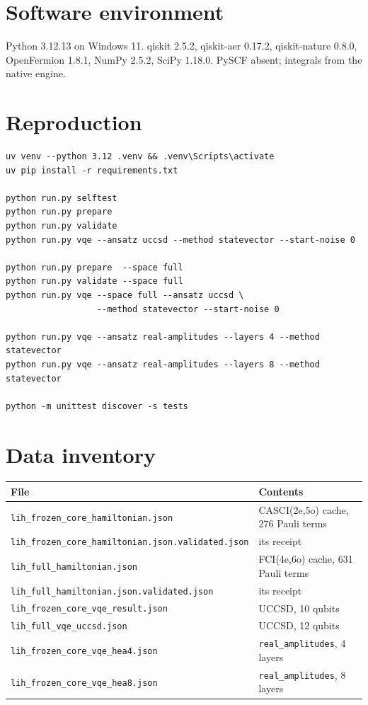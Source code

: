 \documentclass[11pt,a4paper]{article}
\newcommand{\code}[1]{\texttt{\small #1}}
\begin{document}
\section{Software environment}

Python 3.12.13 on Windows 11. qiskit 2.5.2, qiskit-aer 0.17.2, qiskit-nature
0.8.0, OpenFermion 1.8.1, NumPy 2.5.2, SciPy 1.18.0. PySCF absent; integrals
from the native engine.

\section{Reproduction}

\begin{verbatim}
uv venv --python 3.12 .venv && .venv\Scripts\activate
uv pip install -r requirements.txt

python run.py selftest
python run.py prepare
python run.py validate
python run.py vqe --ansatz uccsd --method statevector --start-noise 0

python run.py prepare  --space full
python run.py validate --space full
python run.py vqe --space full --ansatz uccsd \
                  --method statevector --start-noise 0

python run.py vqe --ansatz real-amplitudes --layers 4 --method statevector
python run.py vqe --ansatz real-amplitudes --layers 8 --method statevector

python -m unittest discover -s tests
\end{verbatim}

\section{Data inventory}

\begin{center}
\small
\begin{tabular}{ll}
\toprule
File & Contents \\
\midrule
\code{lih\_frozen\_core\_hamiltonian.json}       & CASCI(2e,5o) cache, 276 Pauli terms \\
\code{lih\_frozen\_core\_hamiltonian.json.validated.json} & its receipt \\
\code{lih\_full\_hamiltonian.json}               & FCI(4e,6o) cache, 631 Pauli terms \\
\code{lih\_full\_hamiltonian.json.validated.json} & its receipt \\
\code{lih\_frozen\_core\_vqe\_result.json}       & UCCSD, 10 qubits \\
\code{lih\_full\_vqe\_uccsd.json}                & UCCSD, 12 qubits \\
\code{lih\_frozen\_core\_vqe\_hea4.json}         & \code{real\_amplitudes}, 4 layers \\
\code{lih\_frozen\_core\_vqe\_hea8.json}         & \code{real\_amplitudes}, 8 layers \\
\bottomrule
\end{tabular}
\end{center}
\end{document}
